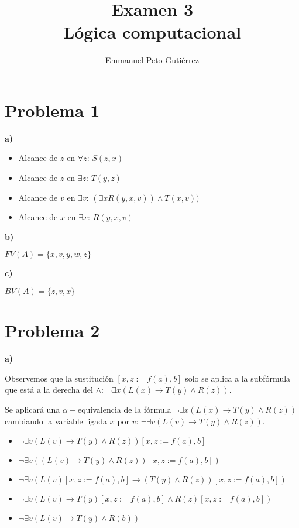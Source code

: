 \documentclass{article}
\title{Examen 3\\Lógica computacional}
\author{Emmanuel Peto Gutiérrez}
\begin{document}
\maketitle

\section*{Problema 1}

\textbf{a)}

\begin{itemize}
\item Alcance de $z$ en $\forall z$: $S(z, x)$
\item Alcance de $z$ en $\exists z$: $T(y, z)$
\item Alcance de $v$ en $\exists v$: $(\exists x R(y,x,v)) \land T(x, v))$
\item Alcance de $x$ en $\exists x$: $R(y, x, v)$
\end{itemize}

\textbf{b)}

$FV(A) = \{ x, v, y, w, z \}$

\textbf{c)}

$BV(A) = \{z, v, x\}$

\section*{Problema 2}

\textbf{a)}

Observemos que la sustitución $[x, z := f(a), b]$ solo se aplica a la subfórmula que está a la derecha del $\land$: $\lnot \exists x (L(x) \rightarrow T(y) \land R(z))$.

Se aplicará una $\alpha-$equivalencia de la fórmula $\lnot \exists x (L(x) \rightarrow T(y) \land R(z))$ cambiando la variable ligada $x$ por $v$: $\lnot \exists v (L(v) \rightarrow T(y) \land R(z))$.

\begin{itemize}
\item $\lnot \exists v (L(v) \rightarrow T(y) \land R(z)) [x, z := f(a), b]$
\item $\lnot \exists v ((L(v) \rightarrow T(y) \land R(z)) [x, z := f(a), b])$
\item $\lnot \exists v (L(v) [x, z := f(a), b] \rightarrow (T(y) \land R(z)) [x, z := f(a), b])$
\item $\lnot \exists v (L(v) \rightarrow T(y) [x, z := f(a), b] \land R(z) [x, z := f(a), b])$
\item $\lnot \exists v (L(v) \rightarrow T(y) \land R(b))$
\end{itemize}
\end{document}
